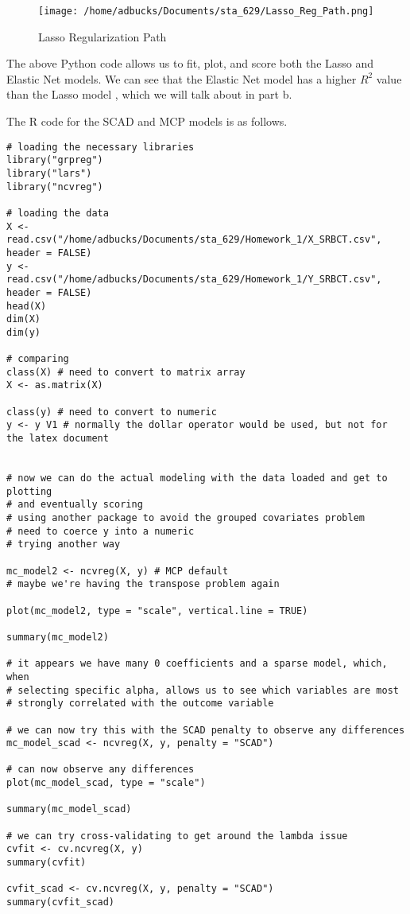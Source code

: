 \documentclass[12pt, letterpaper]{article}
\begin{document}
\begin{figure}
\texttt{[image: /home/adbucks/Documents/sta\_629/Lasso\_Reg\_Path.png]} 
\caption{Lasso Regularization Path} 
\end{figure} 


The above Python code allows us to fit, plot, and score both the Lasso and Elastic Net models. We can see that the Elastic Net model has a higher $R^2$ value than the Lasso model
, which we will talk about in part b. 

The R code for the SCAD and MCP models is as follows. 

\begin{verbatim} 
# loading the necessary libraries 
library("grpreg")
library("lars")
library("ncvreg")

# loading the data 
X <- read.csv("/home/adbucks/Documents/sta_629/Homework_1/X_SRBCT.csv", header = FALSE)
y <- read.csv("/home/adbucks/Documents/sta_629/Homework_1/Y_SRBCT.csv", header = FALSE) 
head(X)
dim(X)
dim(y)

# comparing 
class(X) # need to convert to matrix array 
X <- as.matrix(X)

class(y) # need to convert to numeric
y <- y V1 # normally the dollar operator would be used, but not for the latex document 


# now we can do the actual modeling with the data loaded and get to plotting
# and eventually scoring 
# using another package to avoid the grouped covariates problem 
# need to coerce y into a numeric 
# trying another way 

mc_model2 <- ncvreg(X, y) # MCP default 
# maybe we're having the transpose problem again

plot(mc_model2, type = "scale", vertical.line = TRUE)

summary(mc_model2)

# it appears we have many 0 coefficients and a sparse model, which, when 
# selecting specific alpha, allows us to see which variables are most 
# strongly correlated with the outcome variable

# we can now try this with the SCAD penalty to observe any differences
mc_model_scad <- ncvreg(X, y, penalty = "SCAD")

# can now observe any differences 
plot(mc_model_scad, type = "scale")

summary(mc_model_scad)

# we can try cross-validating to get around the lambda issue 
cvfit <- cv.ncvreg(X, y)
summary(cvfit)

cvfit_scad <- cv.ncvreg(X, y, penalty = "SCAD")
summary(cvfit_scad)
\end{verbatim}
\end{document}
